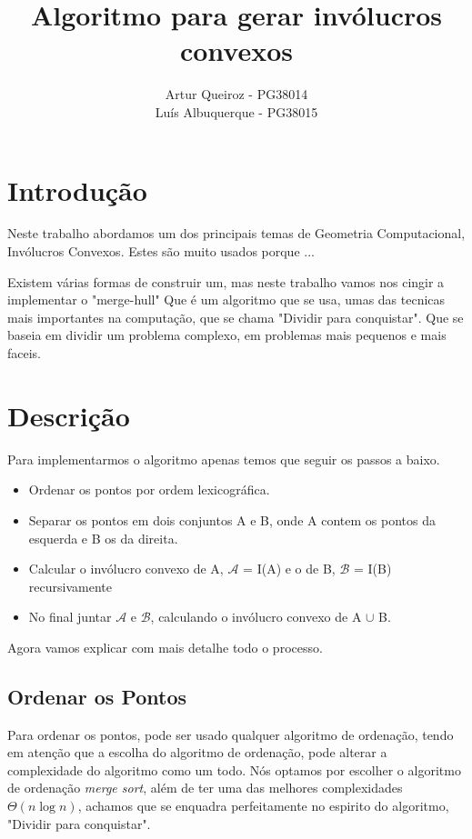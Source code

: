 \documentclass[11pt]{article}
\title{Algoritmo para gerar invólucros convexos}
\author{Artur Queiroz - PG38014\\Luís Albuquerque - PG38015}
\begin{document}
\maketitle

\section{Introdução}
Neste trabalho abordamos um dos principais temas de Geometria 
Computacional, Invólucros Convexos.
Estes são muito usados porque ...

Existem várias formas de construir um, mas neste trabalho vamos
nos cingir a implementar o "merge-hull"
Que é um algoritmo que se usa, umas das tecnicas mais importantes
na computação, que se chama "Dividir para conquistar".
Que se baseia em dividir um problema complexo, em problemas mais 
pequenos e mais faceis.

\section{Descrição}
Para implementarmos o algoritmo apenas temos que seguir os passos
a baixo.

\begin{itemize}
    \item Ordenar os pontos por ordem lexicográfica.
    \item Separar os pontos em dois conjuntos A e B, onde A contem os pontos da esquerda e B os da direita.
    \item Calcular o invólucro convexo de A, $\mathcal{A}$ = I(A) e o de B, $\mathcal{B}$ = I(B) recursivamente
    \item No final juntar $\mathcal{A}$ e $\mathcal{B}$, calculando o invólucro convexo de A $\cup$ B.
\end{itemize}

Agora vamos explicar com mais detalhe todo o processo.
\subsection{ Ordenar os Pontos }
Para ordenar os pontos, pode ser usado qualquer algoritmo de ordenação,
tendo em atenção que a escolha do algoritmo de ordenação, pode alterar a
complexidade do algoritmo como um todo.
Nós optamos por escolher o algoritmo de ordenação \textit{merge sort},
além de ter uma das melhores complexidades $\Theta(n\log{}n)$, achamos 
que se enquadra perfeitamente no espirito do algoritmo, "Dividir para conquistar".
\end{document}
